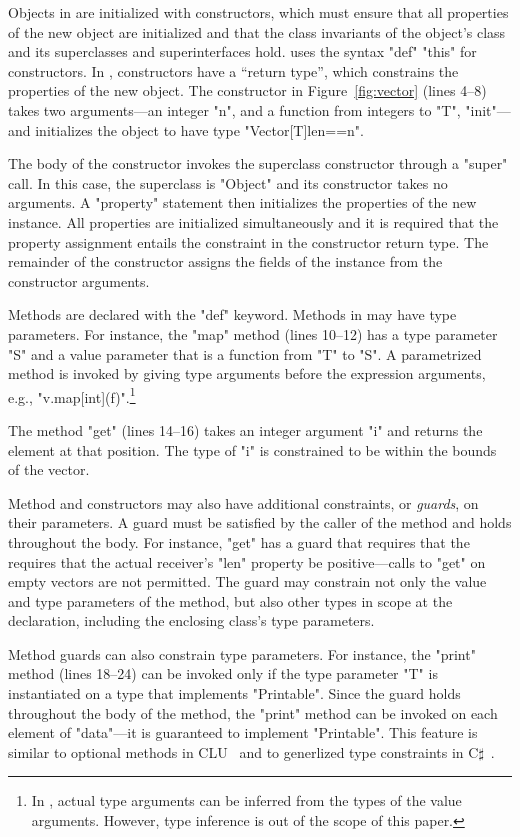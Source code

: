 Objects in \Xten{} are initialized with constructors, which
must ensure that all properties of the new object
are initialized and that the class invariants of the object's
class and its superclasses and superinterfaces hold.
\Xten{} uses the syntax \xcd"def" \xcd"this" for constructors.
In \Xten{}, constructors have a ``return type'', which constrains
the properties of the new object.  The constructor in
Figure~\ref{fig:vector} (lines 4--8) takes
two arguments---an integer \xcd"n", and a function from integers
to \xcd"T", \xcd"init"---and 
initializes the
object to have type \xcd"Vector[T]{len==n}".

The body of the constructor
invokes the superclass constructor through a \xcd"super" call.
In this case, the superclass is
\xcd"Object" and its constructor takes no arguments.
A \xcd"property" statement then initializes the
properties of the new instance.  All properties are initialized
simultaneously and it is required that the property assignment
entails the constraint in the constructor return type.
The remainder of the constructor assigns the fields of the
instance from the constructor arguments.

Methods are declared with the \xcd"def" keyword.
Methods in \Xten may have type parameters.  
For instance, the \xcd"map" method (lines 10--12)
has a type parameter \xcd"S" and a value parameter that is a
function from \xcd"T" to \xcd"S".
A parametrized method is invoked by giving type arguments before the
expression arguments, e.g., \xcd"v.map[int](f)".\footnote{In \Xten, actual type
arguments can be inferred from the types of the value arguments.  However, type
inference is out of the scope of this paper.}

The method \xcd"get" (lines 14--16) takes an integer argument \xcd"i"
and returns the element at that position.  The type of \xcd"i"
is constrained to be within the bounds of the vector. 

Method and constructors
may also have additional
constraints, or \emph{guards}, on their parameters.  A
guard must be satisfied by the caller of the method and
holds throughout the body.
For instance, 
\xcd"get"
has a guard that requires that the 
requires that the actual
receiver's
\xcd"len" property be positive---calls to \xcd"get" on empty
vectors are not permitted.
The guard may constrain not only the value and type parameters of
the method, but also other types in
scope at the declaration, including the enclosing class's type parameters.

Method guards can also constrain type parameters.
For instance, the \xcd"print" method (lines 18--24) can be invoked only if
the type parameter \xcd"T" is instantiated on a type that implements
\xcd"Printable".  Since the guard holds throughout the body of the
method, the \xcd"print" method can be invoked on each element of \xcd"data"---it
is guaranteed to implement \xcd"Printable".
This feature is similar to optional methods in CLU~\cite{clu} and to generlized type constraints in C$\sharp$~\cite{emir06}.


